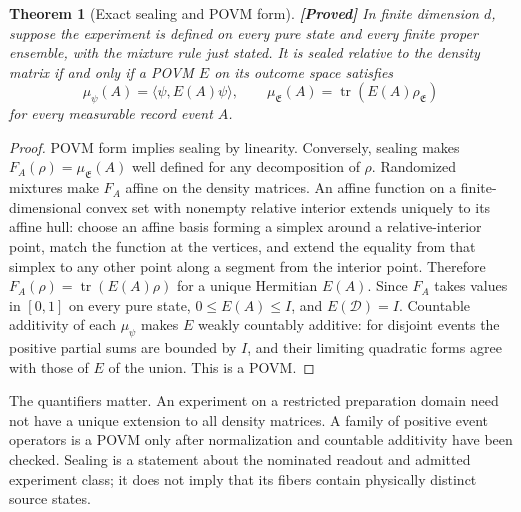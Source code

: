 \documentclass[11pt,a4paper]{article}
\newtheorem{theorem}{Theorem}[section]
\theoremstyle{definition}
\theoremstyle{remark}\newtheorem{remark}[theorem]{Remark}
\newcommand{\status}[1]{\textbf{[#1]}\quad}
\begin{document}
\begin{theorem}[Exact sealing and POVM form]\label{ctx:povm}
\status{Proved}
In finite dimension $d$, suppose the experiment is defined on every pure
state and every finite proper ensemble, with the mixture rule just stated.
It is sealed relative to the density matrix if and only if a POVM $E$ on
its outcome space satisfies
\[
 \mu_\psi(A)=\langle\psi,E(A)\psi\rangle,
 \qquad \mu_{\mathfrak E}(A)=\operatorname{tr}(E(A)\rho_{\mathfrak E})
\]
for every measurable record event $A$.
\end{theorem}
\begin{proof}
POVM form implies sealing by linearity. Conversely, sealing makes
$F_A(\rho)=\mu_{\mathfrak E}(A)$ well defined for any decomposition
of $\rho$. Randomized mixtures make $F_A$ affine on the density matrices.
An affine function on a finite-dimensional convex set with nonempty
relative interior extends uniquely to its affine hull: choose an affine
basis forming a simplex around a relative-interior point, match the
function at the vertices, and extend the equality from that simplex
to any other point along a segment from the interior point. Therefore
$F_A(\rho)=\operatorname{tr}(E(A)\rho)$ for a unique Hermitian $E(A)$.
Since $F_A$ takes values in $[0,1]$ on every pure state,
$0\le E(A)\le I$, and $E(\mathcal D)=I$. Countable additivity of each
$\mu_\psi$ makes $E$ weakly countably additive: for disjoint events the
positive partial sums are bounded by $I$, and their limiting quadratic
forms agree with those of $E$ of the union. This is a POVM.
\end{proof}

The quantifiers matter. An experiment on a restricted preparation domain
need not have a unique extension to all density matrices. A family of
positive event operators is a POVM only after normalization and countable
additivity have been checked. Sealing is a statement about the nominated
readout and admitted experiment class; it does not imply that its fibers
contain physically distinct source states.
\end{document}
